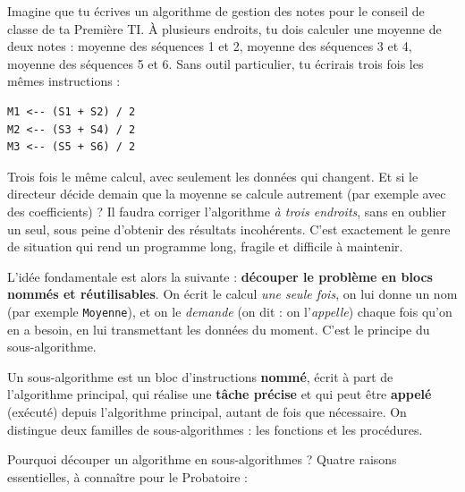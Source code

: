 \documentclass[11pt]{article}
\newcommand{\cle}[1]{{\popxbold\color{popdark}#1}}
\newcounter{popsec}
\newcounter{popsub}
\newcommand{\courssub}[1]{%
  \stepcounter{popsub}%
  \par\vspace{9pt}\noindent{\popxbold\fontsize{11.5}{13}\selectfont\color{popink}{\color{poporange}\thepopsec.\thepopsub}\hspace{6pt}#1}\par\nopagebreak\vspace{4pt}
}
\begin{document}
Imagine que tu écrives un algorithme de gestion des notes pour le conseil de classe de ta Première TI. À plusieurs endroits, tu dois calculer une moyenne de deux notes : moyenne des séquences 1 et 2, moyenne des séquences 3 et 4, moyenne des séquences 5 et 6. Sans outil particulier, tu écrirais trois fois les mêmes instructions :

\begin{lstlisting}
M1 <-- (S1 + S2) / 2
M2 <-- (S3 + S4) / 2
M3 <-- (S5 + S6) / 2
\end{lstlisting}

Trois fois le même calcul, avec seulement les données qui changent. Et si le directeur décide demain que la moyenne se calcule autrement (par exemple avec des coefficients) ? Il faudra corriger l'algorithme \emph{à trois endroits}, sans en oublier un seul, sous peine d'obtenir des résultats incohérents. C'est exactement le genre de situation qui rend un programme long, fragile et difficile à maintenir.

L'idée fondamentale est alors la suivante : \textbf{découper le problème en blocs nommés et réutilisables}. On écrit le calcul \emph{une seule fois}, on lui donne un nom (par exemple \texttt{Moyenne}), et on le \emph{demande} (on dit : on l'\emph{appelle}) chaque fois qu'on en a besoin, en lui transmettant les données du moment. C'est le principe du \cle{sous-algorithme}.

\begin{definition}
Un \cle{sous-algorithme} est un bloc d'instructions \textbf{nommé}, écrit à part de l'algorithme principal, qui réalise une \textbf{tâche précise} et qui peut être \textbf{appelé} (exécuté) depuis l'algorithme principal, autant de fois que nécessaire. On distingue deux familles de sous-algorithmes : les \cle{fonctions} et les \cle{procédures}.
\end{definition}

\courssub{Rôles des sous-algorithmes}

Pourquoi découper un algorithme en sous-algorithmes ? Quatre raisons essentielles, à connaître pour le Probatoire :
\end{document}
